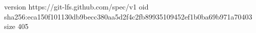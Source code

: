 version https://git-lfs.github.com/spec/v1
oid sha256:eca150f101130db9becc380aa5d2f4c2fb89935109452ef1b0ba69b971a70403
size 405
